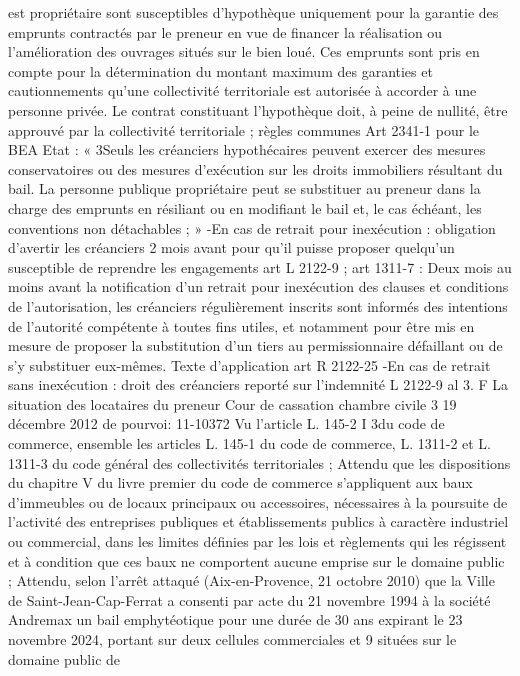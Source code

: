 \documentclass[11pt,a4paper]{report}
\begin{document}
est propriétaire sont susceptibles d'hypothèque uniquement pour la garantie des emprunts contractés par le
preneur en vue de financer la réalisation ou l'amélioration des ouvrages situés sur le bien loué.
Ces emprunts sont pris en compte pour la détermination du montant maximum des garanties et cautionnements
qu'une collectivité territoriale est autorisée à accorder à une personne privée.
Le contrat constituant l'hypothèque doit, à peine de nullité, être approuvé par la collectivité territoriale ;
règles communes
Art 2341-1 pour le BEA Etat : « 3\degre  Seuls les créanciers hypothécaires peuvent exercer des mesures
conservatoires ou des mesures d'exécution sur les droits immobiliers résultant du bail. La personne publique
propriétaire peut se substituer au preneur dans la charge des emprunts en résiliant ou en modifiant le bail et, le
cas échéant, les conventions non détachables ; »
-En cas de retrait pour inexécution : obligation d’avertir les créanciers 2 mois avant pour qu’il puisse proposer
quelqu’un susceptible de reprendre les engagements art L 2122-9 ; art 1311-7 : Deux mois au moins avant la
notification d'un retrait pour inexécution des clauses et conditions de l'autorisation, les créanciers régulièrement
inscrits sont informés des intentions de l'autorité compétente à toutes fins utiles, et notamment pour être mis en
mesure de proposer la substitution d'un tiers au permissionnaire défaillant ou de s'y substituer eux-mêmes.
Texte d’application art R 2122-25
-En cas de retrait sans inexécution : droit des créanciers reporté sur l’indemnité L 2122-9 al 3.
F La situation des locataires du preneur
Cour de cassation chambre civile 3 19 décembre 2012 \No  de pourvoi: 11-10372
Vu l'article L. 145-2 I 3\degre  du code de commerce, ensemble les articles L. 145-1 du code de commerce, L. 1311-2
et L. 1311-3 du code général des collectivités territoriales ;
Attendu que les dispositions du chapitre V du livre premier du code de commerce s'appliquent aux baux
d'immeubles ou de locaux principaux ou accessoires, nécessaires à la poursuite de l'activité des entreprises
publiques et établissements publics à caractère industriel ou commercial, dans les limites définies par les lois et
règlements qui les régissent et à condition que ces baux ne comportent aucune emprise sur le domaine public ;
Attendu, selon l'arrêt attaqué (Aix-en-Provence, 21 octobre 2010) que la Ville de Saint-Jean-Cap-Ferrat a
consenti par acte du 21 novembre 1994 à la société Andremax un bail emphytéotique pour une durée de 30 ans
expirant le 23 novembre 2024, portant sur deux cellules commerciales  et 9 situées sur le domaine public de
\end{document}
